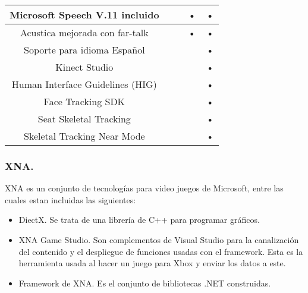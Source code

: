 \documentclass[11pt,a4paper]{article}
\begin{document}
\begin{tabular}{||c||c||c||c||c||}
\hline Microsoft Speech V.11 incluido           &        &        & •         & •           \\  
\hline Acustica mejorada con far-talk           &        &        & •         & •           \\  
\hline Soporte para idioma Español              &        &        &           & •           \\ 
\hline Kinect Studio                            &        &        &           & •           \\ 
\hline Human Interface Guidelines (HIG)         &        &        &           & •           \\ 
\hline Face Tracking SDK                        &        &        &           & •           \\ 
\hline Seat Skeletal Tracking                   &        &        &           & •           \\ 
\hline Skeletal Tracking Near Mode              &        &        &           & •           \\ 
\hline 
\end{tabular} 

\subsubsection{XNA.}
XNA es un conjunto de tecnologías para video juegos de Microsoft, entre las cuales estan incluidas las siguientes: 
\begin{itemize}
\item DiectX. Se trata de una librería de C++ para programar gráficos.
\item XNA Game Studio. Son complementos de Visual Studio para la canalización del contenido y el despliegue de funciones usadas con el framework. Esta es la herramienta usada al hacer un juego para Xbox y enviar los datos a este.
\item Framework de XNA. Es el conjunto de bibliotecas .NET construidas.
\end{itemize}
\end{document}
